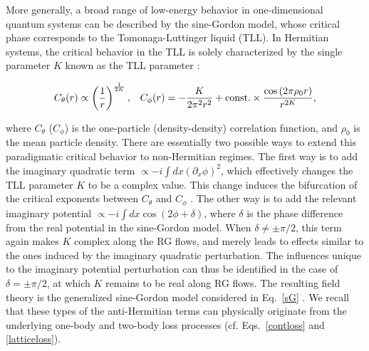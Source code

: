 \documentclass{tADP2e}
\theoremstyle{plain}
\newcommand{\eqn}[1]{
\begin{eqnarray}
	#1
\end{eqnarray}
}
\theoremstyle{plain}
\theoremstyle{definition}
\begin{document}
More generally, a broad range of low-energy behavior in one-dimensional quantum systems can be described by the sine-Gordon model, whose critical phase corresponds to the Tomonaga-Luttinger liquid (TLL). In Hermitian systems, the critical behavior in the TLL is solely characterized by the single parameter $K$ known as the TLL parameter \cite{TG03}:
\eqn{C_{\theta}(r)\propto\left(\frac{1}{r}\right)^{\frac{1}{2K}},\;\;\;C_{\phi}(r)=-\frac{K}{2\pi^{2}r^{2}}+{\rm const.}\times\frac{\cos\left(2\pi\rho_{0}r\right)}{r^{2K}},
}
where $C_\theta$ ($C_\phi$) is the one-particle (density-density) correlation function, and $\rho_0$ is the mean particle density. 
 There are essentially two possible ways to extend this paradigmatic critical behavior to non-Hermitian regimes. The first way is to add the imaginary quadratic term $\propto-i\int dx(\partial_x\phi)^2$, which effectively changes the  TLL parameter $K$ to be a complex value. This change induces the bifurcation of the critical exponents between $C_\theta$ and $C_\phi$ \cite{YA16crit}. The other way is to add the relevant imaginary potential $\propto -i \int dx\cos(2\phi+\delta)$, where $\delta$ is the phase difference from the real potential in the sine-Gordon model. When $\delta\neq \pm\pi/2$,  this term again makes $K$ complex along the RG flows, and merely leads to effects similar to the ones induced by the imaginary quadratic perturbation.   The influences unique to the imaginary potential perturbation can thus be identified in the case of $\delta=\pm\pi/2$, at which $K$ remains to be real along RG flows. The resulting field theory is the generalized sine-Gordon model considered in Eq.~\eqref{sG} \cite{CMB05,YA17nc}. We recall that these types of the anti-Hermitian terms can physically originate from the underlying one-body and two-body loss processes (cf. Eqs.~\eqref{contloss} and \eqref{latticeloss}). 
\end{document}
